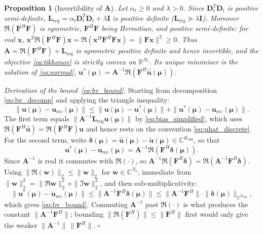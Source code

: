 ﻿\documentclass[a4paper,12pt]{article}
\newtheorem{proposition}{Proposition}[section]
\theoremstyle{definition}
\theoremstyle{remark}
\newcommand{\C}{\mathbb{C}}
\newcommand{\vmu}{\bm{\mu}}
\newcommand{\R}{\mathbb{R}}
\begin{document}
\begin{proposition}[Invertibility of $\bm{A}$]
Let $\alpha_t \ge 0$ and $\lambda > 0$. Since $\bm{D}_t^T\bm{D}_t$ is positive semi-definite, $\bm{L}_{\mathrm{reg}} = \alpha_t\bm{D}_t^T\bm{D}_t + \lambda\bm{I}$ is positive definite ($\bm{L}_{\mathrm{reg}} \succeq \lambda\bm{I}$). Moreover $\Re(\bm{F}^H\bm{F})$ is symmetric, $\bm{F}^H\bm{F}$ being Hermitian, and positive semi-definite: for real $\bm{x}$, $\bm{x}^T\Re(\bm{F}^H\bm{F})\bm{x} = \Re(\bm{x}^H\bm{F}^H\bm{F}\bm{x}) = \|\bm{F}\bm{x}\|^2 \ge 0$. Thus $\bm{A} = \Re(\bm{F}^H\bm{F}) + \bm{L}_{\mathrm{reg}}$ is symmetric positive definite and hence invertible, and the objective \eqref{eq:tikhonov} is strictly convex on $\R^{N_t}$. Its unique minimiser is the solution of \eqref{eq:normal}, $\bm{u}^*(\vmu) = \bm{A}^{-1}\Re(\bm{F}^H\hat{\bm{u}}(\vmu))$.
\end{proposition}

\textit{Derivation of the bound~\eqref{eq:bv_bound}.}
Starting from decomposition \eqref{eq:bv_decomp} and applying the triangle inequality:
\[
    \|\bm{u}(\vmu) - \bm{u}_{\mathrm{rec}}(\vmu)\| \leq \|\bm{u}(\vmu) - \bm{u}^*(\vmu)\| + \|\bm{u}^*(\vmu) - \bm{u}_{\mathrm{rec}}(\vmu)\|.
\]
The first term equals $\|\bm{A}^{-1}\bm{L}_{\mathrm{reg}}\bm{u}(\vmu)\|$ by \eqref{eq:bias_simplified}, which uses $\Re(\bm{F}^H\hat{\bm{u}}) = \Re(\bm{F}^H\bm{F})\bm{u}$ and hence rests on the convention \eqref{eq:uhat_discrete}. For the second term, write $\bm{\delta}(\vmu) = \hat{\bm{u}}(\vmu) - \tilde{\bm{u}}(\vmu) \in \C^{K_{\mathrm{full}}}$, so that
\[
    \bm{u}^*(\vmu) - \bm{u}_{\mathrm{rec}}(\vmu)
    = \bm{A}^{-1}\Re\!\left(\bm{F}^H\bm{\delta}(\vmu)\right).
\]
Since $\bm{A}^{-1}$ is real it commutes with $\Re(\cdot)$, so $\bm{A}^{-1}\Re(\bm{F}^H\bm{\delta}) = \Re(\bm{A}^{-1}\bm{F}^H\bm{\delta})$. Using $\|\Re(\bm{w})\|_2 \le \|\bm{w}\|_2$ for $\bm{w} \in \C^{N_t}$, immediate from $\|\bm{w}\|_2^2 = \|\Re\bm{w}\|_2^2 + \|\Im\bm{w}\|_2^2$, and then sub-multiplicativity:
\[
    \|\bm{u}^*(\vmu) - \bm{u}_{\mathrm{rec}}(\vmu)\|
    \leq \|\bm{A}^{-1}\bm{F}^H\bm{\delta}(\vmu)\|
    \leq \|\bm{A}^{-1}\bm{F}^H\| \cdot \|\bm{\delta}(\vmu)\|_{\C^{K_{\mathrm{full}}}},
\]
which gives \eqref{eq:bv_bound}. Commuting $\bm{A}^{-1}$ past $\Re(\cdot)$ is what produces the constant $\|\bm{A}^{-1}\bm{F}^H\|$; bounding $\|\Re(\bm{F}^H)\| \le \|\bm{F}^H\|$ first would only give the weaker $\|\bm{A}^{-1}\|\,\|\bm{F}^H\|$. \hfill$\square$
\end{document}
